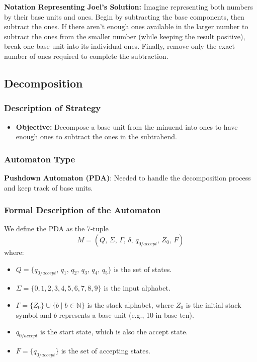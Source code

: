 \documentclass[11pt]{article}
\begin{document}
      \noindent \textbf{Notation Representing Joel's Solution:}
      \noindent Imagine representing both numbers by their base units and ones. Begin by subtracting the base components, then subtract the ones. If there aren't enough ones available in the larger number to subtract the ones from the smaller number (while keeping the result positive), break one base unit into its individual ones. Finally, remove only the exact number of ones required to complete the subtraction.


\subsection*{Decomposition}

\subsubsection*{Description of Strategy}
\begin{itemize}
    \item \textbf{Objective:} Decompose a base unit from the minuend into ones to have enough ones to subtract the ones in the subtrahend.
\end{itemize}

\subsubsection*{Automaton Type}
\textbf{Pushdown Automaton (PDA)}: Needed to handle the decomposition process and keep track of base units.

\subsubsection*{Formal Description of the Automaton}

We define the PDA as the 7-tuple
\[
M = (Q,\,\Sigma,\,\Gamma,\,\delta,\,q_{0/accept},\,Z_0,\,F)
\]
where:
\begin{itemize}
    \item \(Q = \{q_{0/accept},\, q_1,\, q_2,\, q_3,\, q_4,\, q_5\}\) is the set of states.
    \item \(\Sigma = \{0,1,2,3,4,5,6,7,8,9\}\) is the input alphabet.
    \item \(\Gamma = \{Z_0\} \cup \{b \mid b \in \mathbb{N}\}\) is the stack alphabet, where \(Z_0\) is the initial stack symbol and \(b\) represents a base unit (e.g., 10 in base-ten).
    \item \(q_{0/accept}\) is the start state, which is also the accept state.
    \item \(F = \{q_{0/accept}\}\) is the set of accepting states.
\end{itemize}
\end{document}
